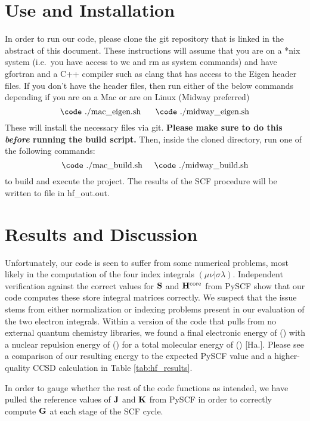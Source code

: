 \documentclass[%
 aip,
 amsmath,amssymb,
 reprint,%
]{revtex4-1}
\begin{document}
\section{Use and Installation}
In order to run our code, please clone the git repository that is linked in
the abstract of this document. These instructions will assume that you are
 on a *nix system (i.e.\ you have access to {\code wc} and {\code rm} as
 system commands) and have {\code gfortran} and a C++ compiler such as 
 {\code clang} that has access to the Eigen header files. If you don't
have the header files,  then run either of the below commands depending if you
are on a Mac or are on Linux (Midway preferred)
$$ \text{{\code ./mac\_eigen.sh} \hspace{0.5cm}{\code ./midway\_eigen.sh}}$$
These will install the necessary files via git.  \textbf{Please make sure to
do this \emph{before} running the build script.} Then, inside the cloned
directory, run one of the following commands: 
%
$$ \text{{\code ./mac\_build.sh}} \hspace{0.5cm}
 \text{{\code ./midway\_build.sh}} $$
to build and execute the project. The results of the SCF procedure will be
 written to file in {\code hf\_out.out}.

\section{Results and Discussion}
Unfortunately, our code is seen to suffer from some numerical problems, most
likely in the computation of the four index integrals $\left(\mu\nu |
\sigma\lambda\right)$. Independent verification against the correct values for
$\bold{S}$ and $\bold{H}^{\text{core}}$ from PySCF show that our code computes
these store integral matrices correctly.  We suspect that the issue stems from
either normalization or indexing problems present in our evaluation of the two
electron integrals.  Within a version of the code that pulls from no external
quantum chemistry libraries, we found a final electronic energy of () with a
nuclear repulsion energy of () for a total molecular energy of () [Ha.].
Please see a comparison of our resulting energy to the expected PySCF value
and a higher-quality CCSD calculation  in Table \ref{tab:hf_results}. 

In order to gauge whether the rest of the code functions as intended, we have
pulled the reference values of $\bold{J}$ and $\bold{K}$ from PySCF in order to correctly
compute $\bold{G}$ at each stage of the SCF cycle. 
\end{document}
